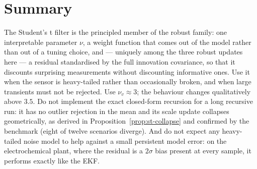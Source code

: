 \section{Summary}
The Student's t filter is the principled member of the robust family: one interpretable parameter
$\nu$, a weight function that comes out of the model rather than out of a tuning choice, and ---
uniquely among the three robust updates here --- a residual standardised by the full innovation
covariance, so that it discounts surprising measurements without discounting informative ones.
Use it when the sensor is heavy-tailed rather than occasionally broken, and when large transients
must not be rejected.  Use $\nu_v\approx3$; the behaviour changes qualitatively above $3.5$.  Do
not implement the exact closed-form recursion for a long recursive run: it has no outlier rejection
in the mean and its scale update collapses geometrically, as derived in
Proposition~\ref{prop:st-collapse} and confirmed by the benchmark (eight of twelve scenarios
diverge).  And do not expect any heavy-tailed noise model to help against a small persistent model
error: on the electrochemical plant, where the residual is a $2\sigma$ bias present at every
sample, it performs exactly like the EKF.
